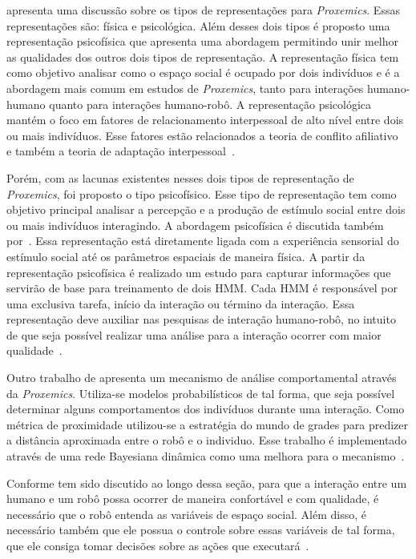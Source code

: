  apresenta uma discussão sobre os tipos de representações para \emph{Proxemics}. Essas representações são: física e psicológica. Além desses dois tipos é proposto uma representação psicofísica que apresenta uma abordagem permitindo unir melhor as qualidades dos outros dois tipos de representação. A representação física tem como objetivo analisar como o espaço social é ocupado por dois indivíduos e é a abordagem mais comum em estudos de \emph{Proxemics}, tanto para interações humano-humano quanto para interações humano-robô. A representação psicológica mantém o foco em fatores de relacionamento interpessoal de alto nível entre dois ou mais indivíduos. Esse fatores estão relacionados a teoria de conflito afiliativo~\cite{Argyle:1965} e também a teoria de adaptação interpessoal~\cite{Burgoon:2007}. 

Porém, com as lacunas existentes nesses dois tipos de representação de \emph{Proxemics}, foi proposto o tipo psicofísico. Esse tipo de representação tem como objetivo principal analisar a percepção e a produção de estímulo social entre dois ou mais indivíduos interagindo. A abordagem psicofísica é discutida também por~. Essa representação está diretamente ligada com a experiência sensorial do estímulo social até os parâmetros espaciais de maneira física. A partir da representação psicofísica é realizado um estudo para capturar informações que servirão de base para treinamento de dois HMM. Cada HMM é responsável por uma exclusiva tarefa, início da interação ou término da interação. Essa representação deve auxiliar nas pesquisas de interação humano-robô, no intuito de que seja possível realizar uma análise para a interação ocorrer com maior qualidade~\cite{Mead:2012}.

Outro trabalho de  apresenta um mecanismo de análise comportamental através da \emph{Proxemics}. Utiliza-se modelos probabilísticos de tal forma, que seja possível determinar alguns comportamentos dos indivíduos durante uma interação. Como métrica de proximidade utilizou-se a estratégia do mundo de grades para predizer a distância aproximada entre o robô e o individuo. Esse trabalho é implementado através de uma rede Bayesiana dinâmica como uma melhora para o mecanismo~\cite{Mead:2012b}.

Conforme tem sido discutido ao longo dessa seção, para que a interação entre um humano e um robô possa ocorrer de maneira confortável e com qualidade, é necessário que o robô entenda as variáveis de espaço social. Além disso, é necessário também que ele possua o controle sobre essas variáveis de tal forma, que ele consiga tomar decisões sobre as ações que executará~\cite{Mead:2013b}.

